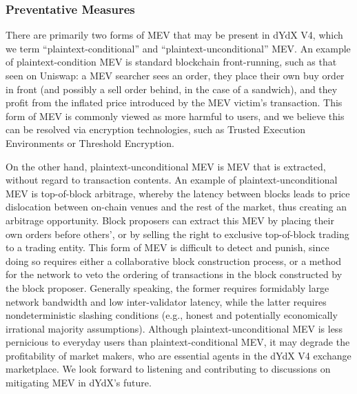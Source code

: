         \subsubsection{Preventative Measures}

            There are primarily two forms of MEV that may be present in dYdX V4, which we term ``plaintext-conditional''  and ``plaintext-unconditional'' MEV. An example of plaintext-condition MEV is standard blockchain front-running, such as that seen on Uniswap: a  MEV searcher sees an order, they place their own buy order in front (and possibly a sell order behind, in the case of a sandwich), and they profit from the inflated price introduced by the MEV victim's transaction. This form of MEV is commonly viewed as more harmful to users, and we believe this can be resolved via encryption technologies, such as Trusted Execution Environments or Threshold Encryption.

            On the other hand, plaintext-unconditional MEV is MEV that is extracted, without regard to transaction contents. An example of plaintext-unconditional MEV is top-of-block arbitrage, whereby the latency between blocks leads to price dislocation between on-chain venues and the rest of the market, thus creating an arbitrage opportunity. Block proposers can extract this MEV by placing their own orders before others', or by selling the right to exclusive top-of-block trading to a trading entity. This form of MEV is difficult to detect and punish, since doing so requires either a collaborative block construction process, or a method for the network to veto the ordering of transactions in the block constructed by the block proposer. Generally speaking, the former requires formidably large network bandwidth and low inter-validator latency, while the latter requires nondeterministic slashing conditions (e.g., honest and potentially economically irrational majority assumptions). Although plaintext-unconditional MEV is less pernicious to everyday users than plaintext-conditional MEV, it may degrade the profitability of market makers, who are essential agents in the dYdX V4 exchange marketplace. We look forward to listening and contributing to discussions on mitigating MEV in dYdX's future.
            
